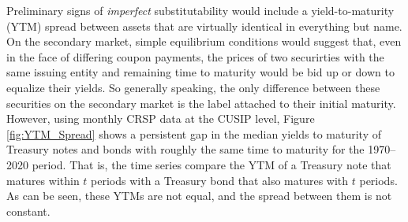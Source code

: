 \documentclass[11pt,a4paper,margin=1.5in]{article}
\begin{document}
Preliminary signs of {\em imperfect} substitutability would include a yield-to-maturity (YTM) spread between assets that are virtually identical in everything but name.
On the secondary market, simple equilibrium conditions would suggest that, even in the face of differing coupon payments, the prices of two securirties with the same issuing entity and remaining time to maturity would be bid up or down to equalize their yields.
So generally speaking, the only difference between these securities on the secondary market is the label attached to their initial maturity.
However, using monthly CRSP data at the CUSIP level, Figure \ref{fig:YTM_Spread} shows a persistent gap in the median yields to maturity of Treasury notes and bonds with roughly the same time to maturity for the 1970--2020 period.
That is, the time series compare the YTM of a Treasury note that matures within $t$ periods with a Treasury bond that also matures with $t$ periods.
As can be seen, these YTMs are not equal, and the spread between them is not constant.

\end{document}
